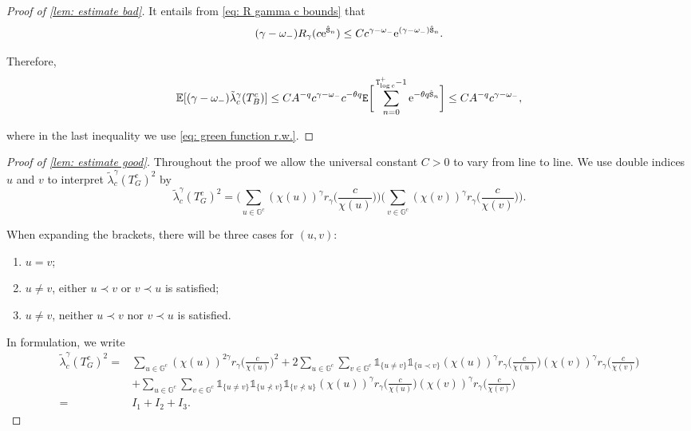 \documentclass[12pt]{article}
\numberwithin{equation}{section}
\theoremstyle{plain}
\theoremstyle{definition}
\begin{document}
\begin{proof}[Proof of \cref{lem: estimate bad}]
\noindent It entails from \eqref{eq: R gamma c bounds} that
\begin{equation}\label{eq: R gamma bounds 2}
(\gamma-\omega_-)R_{\gamma}(c\mathrm{e}^{{\hat{\tt S}}_n})\leq Cc^{\gamma-\omega_-}\mathrm{e}^{(\gamma-\omega_-){\hat{\tt S}}_n}.
\end{equation}

\noindent Therefore,
\[\mathbb{E}[(\gamma-\omega_-)\tilde{\lambda}^{\gamma}_c(T^c_B)]\leq CA^{- q}c^{\gamma-\omega_-}c^{-\theta q}{\tt E}\bigg[\sum^{{\tt T}_{\log c}^+-1}_{n=0} \mathrm{e}^{-\theta q{\hat{\tt S}}_n}\bigg]\leq CA^{- q}c^{\gamma-\omega_-}, \]

\noindent where in the last inequality we use \eqref{eq: green function r.w.}.
\end{proof}

\begin{proof}[Proof of \cref{lem: estimate good}]
Throughout the proof we allow the universal constant $C>0$ to vary from line to line. We use double indices $u$ and $v$ to interpret $\tilde{\lambda}^{\gamma}_c(T^c_G)^2$ by
\[\tilde{\lambda}^{\gamma}_c(T^c_G)^2 = \bigg(\sum_{u\in\mathbb{G}^c}(\chi(u))^{\gamma}r_{\gamma}\Big(\frac{c}{\chi(u)}\Big)\bigg)\bigg(\sum_{v\in\mathbb{G}^c}(\chi(v))^{\gamma}r_{\gamma}\Big(\frac{c}{\chi(v)}\Big)\bigg). \]

\noindent When expanding the brackets, there will be three cases for $(u, v)$:
\begin{enumerate}
   \item $u = v$;
   \item $u\ne v$, either $u\prec v$ or $v\prec u$ is satisfied;
   \item $u\ne v$, neither $u\prec v$ nor $v\prec u$ is satisfied.
\end{enumerate}
\noindent In formulation, we write
\begin{align*}
\tilde{\lambda}^{\gamma}_c(T^c_G)^2 =& \sum_{u\in\mathbb{G}^c}(\chi(u))^{2\gamma}r_{\gamma}\Big(\frac{c}{\chi(u)}\Big)^2 + 2\sum_{u\in\mathbb{G}^c} \sum_{v\in\mathbb{G}^c} \mathds{1}_{\{u\ne v\}}\mathds{1}_{\{u\prec v\}}(\chi(u))^{\gamma}r_{\gamma}\Big(\frac{c}{\chi(u)}\Big)(\chi(v))^{\gamma}r_{\gamma}\Big(\frac{c}{\chi(v)}\Big)\\
& + \sum_{u\in\mathbb{G}^c} \sum_{v\in\mathbb{G}^c} \mathds{1}_{\{u\ne v\}}\mathds{1}_{\{u\nprec v\}}\mathds{1}_{\{v\nprec u\}} (\chi(u))^{\gamma}r_{\gamma}\Big(\frac{c}{\chi(u)}\Big)(\chi(v))^{\gamma}r_{\gamma}\Big(\frac{c}{\chi(v)}\Big)\\
=& I_1 + I_2 + I_3.
\end{align*}


\end{proof}
\end{document}

